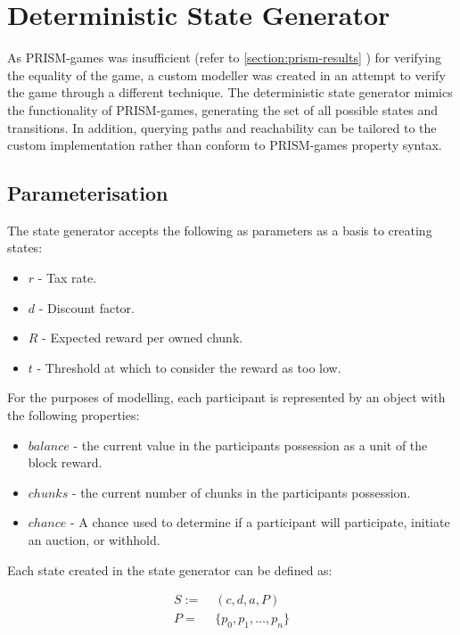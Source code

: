 \section{Deterministic State Generator}

As PRISM-games was insufficient (refer to \cref{section:prism-results} ) for verifying the equality of the game, a custom modeller was created in an attempt to verify the game through a different technique. The deterministic state generator mimics the functionality of PRISM-games, generating the set of all possible states and transitions. In addition, querying paths and reachability can be tailored to the custom implementation rather than conform to PRISM-games property syntax.

\subsection{Parameterisation}

The state generator accepts the following as parameters as a basis to creating states:

\begin{itemize}
    \item $r$ - Tax rate.
    \item $d$ - Discount factor.
    \item $R$ - Expected reward per owned chunk.
    \item $t$ - Threshold at which to consider the reward as too low.
\end{itemize}

For the purposes of modelling, each participant is represented by an object with the following properties:

\begin{itemize}
    \item $balance$ - the current value in the participants possession as a unit of the block reward.
    \item $chunks$ - the current number of chunks in the participants possession.
    \item $chance$ - A chance used to determine if a participant will participate, initiate an auction, or withhold.
\end{itemize}

Each state created in the state generator can be defined as:

\begin{align}
    S :=&\; (c, d, a, P) \\
    P =&\; \{p_0, p_1, \ldots, p_n\}
\end{align}

